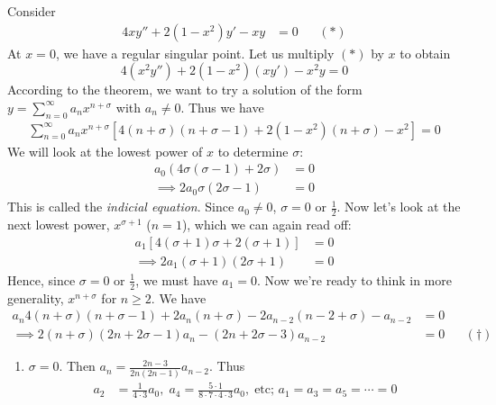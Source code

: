 \documentclass{../../template/note}
\begin{document}
    
    
    \begin{example}
        Consider
        \begin{align*}
            4xy''+2(1-x^2)y'-xy&=0 && (*)
        \end{align*}
        At \(x=0\), we have a regular singular point. Let us multiply \((*)\) by \(x\) to obtain
        \[
            4(x^2y'')+2(1-x^2)(xy')-x^2y=0
        \]
        According to the theorem, we want to try a solution of the form \(y = \sum_{n=0}^\infty a_n x^{n+\sigma}\) with \(a_n \neq 0\). Thus we have
        \begin{align*}
            \sum_{n=0}^\infty a_n x^{n+\sigma}[4(n+\sigma)(n+\sigma-1)+2(1-x^2)(n+\sigma)-x^2]=0
        \end{align*}
        We will look at the lowest power of \(x\) to determine \(\sigma\):
        \begin{align*}
            a_0(4\sigma(\sigma-1)+2\sigma)&=0 \\
            \implies 2a_0\sigma(2\sigma-1)&=0
        \end{align*}
        This is called the \emph{indicial equation}. Since \(a_0 \neq 0\), \(\sigma = 0\) or \(\frac{1}{2}\). Now let's look at the next lowest power, \(x^{\sigma+1}\) (\(n=1\)), which we can again read off:
        \begin{align*}
            a_1[4(\sigma+1)\sigma+2(\sigma+1)]&=0 \\
            \implies 2a_1(\sigma+1)(2\sigma+1)&=0
        \end{align*}
        Hence, since \(\sigma = 0\) or \(\frac{1}{2}\), we must have \(a_1 = 0\). Now we're ready to think in more generality, \(x^{n+\sigma}\) for \(n \geq 2\). We have
        \begin{align*}
            a_n4(n+\sigma)(n+\sigma-1)+2a_n(n+\sigma)-2a_{n-2}(n-2+\sigma)-a_{n-2}&=0 \\
            \implies 2(n+\sigma)(2n+2\sigma-1)a_n - (2n+2\sigma-3)a_{n-2} &= 0 && (\dagger)
        \end{align*}
        \begin{enumerate}[label=\protect\circled{\arabic*}]
            \item \(\sigma=0\). Then \(a_n = \frac{2n-3}{2n(2n-1)}a_{n-2}\). Thus
            \begin{align*}
                a_2 &= \frac{1}{4 \cdot 3}a_0,\; a_4 = \frac{5 \cdot 1}{8 \cdot 7 \cdot 4 \cdot 3}a_0, \; \text{etc; } a_1 = a_3 = a_5 = \cdots = 0 \\

\end{align*}
\end{enumerate}
\end{example}
\end{document}
